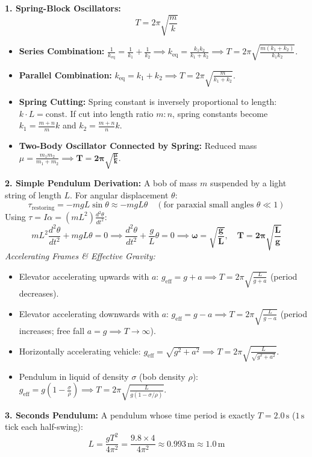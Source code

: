 \documentclass[10pt,twoside,openright]{book}
\begin{document}
\begin{formulabox}
\textbf{1. Spring-Block Oscillators:}
\begin{equation}
  T = 2\pi \sqrt{\frac{m}{k}}
\end{equation}
\begin{itemize}
  \item \textbf{Series Combination:} $\frac{1}{k_{\text{eq}}} = \frac{1}{k_1} + \frac{1}{k_2} \implies k_{\text{eq}} = \frac{k_1 k_2}{k_1 + k_2} \implies T = 2\pi\sqrt{\frac{m(k_1+k_2)}{k_1 k_2}}$.
  \item \textbf{Parallel Combination:} $k_{\text{eq}} = k_1 + k_2 \implies T = 2\pi\sqrt{\frac{m}{k_1 + k_2}}$.
  \item \textbf{Spring Cutting:} Spring constant is inversely proportional to length: $k \cdot L = \text{const}$. If cut into length ratio $m : n$, spring constants become $k_1 = \frac{m+n}{m}k$ and $k_2 = \frac{m+n}{n}k$.
  \item \textbf{Two-Body Oscillator Connected by Spring:} Reduced mass $\mu = \frac{m_1 m_2}{m_1 + m_2} \implies \mathbf{T = 2\pi\sqrt{\frac{\mu}{k}}}$.
\end{itemize}
\textbf{2. Simple Pendulum Derivation:}
A bob of mass $m$ suspended by a light string of length $L$. For angular displacement $\theta$:
\begin{equation}
  \tau_{\text{restoring}} = -m g L \sin\theta \approx -m g L \theta \quad (\text{for paraxial small angles } \theta \ll 1)
\end{equation}
Using $\tau = I \alpha = (m L^2) \frac{d^2\theta}{dt^2}$:
\begin{equation}
  m L^2 \frac{d^2\theta}{dt^2} + m g L \theta = 0 \implies \frac{d^2\theta}{dt^2} + \frac{g}{L}\theta = 0 \implies \mathbf{\omega = \sqrt{\frac{g}{L}}}, \quad \mathbf{T = 2\pi\sqrt{\frac{L}{g}}}
\end{equation}
\textit{Accelerating Frames \& Effective Gravity:}
\begin{itemize}
  \item Elevator accelerating upwards with $a$: $g_{\text{eff}} = g + a \implies T = 2\pi\sqrt{\frac{L}{g+a}}$ (period decreases).
  \item Elevator accelerating downwards with $a$: $g_{\text{eff}} = g - a \implies T = 2\pi\sqrt{\frac{L}{g-a}}$ (period increases; free fall $a=g \implies T \to \infty$).
  \item Horizontally accelerating vehicle: $g_{\text{eff}} = \sqrt{g^2 + a^2} \implies T = 2\pi\sqrt{\frac{L}{\sqrt{g^2 + a^2}}}$.
  \item Pendulum in liquid of density $\sigma$ (bob density $\rho$): $g_{\text{eff}} = g\left(1 - \frac{\sigma}{\rho}\right) \implies T = 2\pi\sqrt{\frac{L}{g(1 - \sigma/\rho)}}$.
\end{itemize}
\textbf{3. Seconds Pendulum:} A pendulum whose time period is exactly $T = 2.0\,\mathrm{s}$ ($1\,\mathrm{s}$ tick each half-swing):
\begin{equation}
  L = \frac{g T^2}{4\pi^2} = \frac{9.8 \times 4}{4\pi^2} \approx \mathbf{0.993\,\mathrm{m} \approx 1.0\,\mathrm{m}}
\end{equation}
\end{formulabox}
\end{document}
